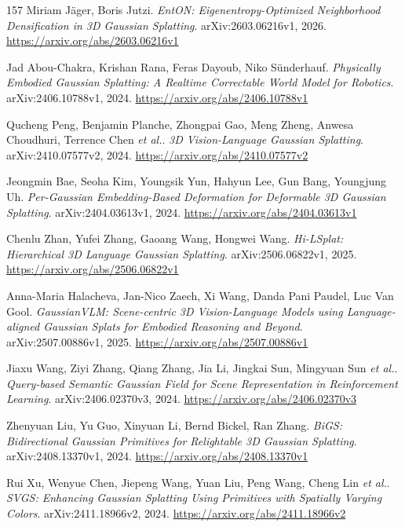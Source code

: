 \documentclass[11pt,a4paper]{article}
\begin{document}
\begin{thebibliography}{157}
Miriam J\"{a}ger, Boris Jutzi.
\newblock \emph{EntON: Eigenentropy-Optimized Neighborhood Densification in 3D Gaussian Splatting}.
\newblock arXiv:2603.06216v1, 2026.
\newblock \url{https://arxiv.org/abs/2603.06216v1}

Jad Abou-Chakra, Krishan Rana, Feras Dayoub, Niko S\"{u}nderhauf.
\newblock \emph{Physically Embodied Gaussian Splatting: A Realtime Correctable World Model for Robotics}.
\newblock arXiv:2406.10788v1, 2024.
\newblock \url{https://arxiv.org/abs/2406.10788v1}

Qucheng Peng, Benjamin Planche, Zhongpai Gao, Meng Zheng, Anwesa Choudhuri, Terrence Chen \emph{et al.}.
\newblock \emph{3D Vision-Language Gaussian Splatting}.
\newblock arXiv:2410.07577v2, 2024.
\newblock \url{https://arxiv.org/abs/2410.07577v2}

Jeongmin Bae, Seoha Kim, Youngsik Yun, Hahyun Lee, Gun Bang, Youngjung Uh.
\newblock \emph{Per-Gaussian Embedding-Based Deformation for Deformable 3D Gaussian Splatting}.
\newblock arXiv:2404.03613v1, 2024.
\newblock \url{https://arxiv.org/abs/2404.03613v1}

Chenlu Zhan, Yufei Zhang, Gaoang Wang, Hongwei Wang.
\newblock \emph{Hi-LSplat: Hierarchical 3D Language Gaussian Splatting}.
\newblock arXiv:2506.06822v1, 2025.
\newblock \url{https://arxiv.org/abs/2506.06822v1}

Anna-Maria Halacheva, Jan-Nico Zaech, Xi Wang, Danda Pani Paudel, Luc Van Gool.
\newblock \emph{GaussianVLM: Scene-centric 3D Vision-Language Models using Language-aligned Gaussian Splats for Embodied Reasoning and Beyond}.
\newblock arXiv:2507.00886v1, 2025.
\newblock \url{https://arxiv.org/abs/2507.00886v1}

Jiaxu Wang, Ziyi Zhang, Qiang Zhang, Jia Li, Jingkai Sun, Mingyuan Sun \emph{et al.}.
\newblock \emph{Query-based Semantic Gaussian Field for Scene Representation in Reinforcement Learning}.
\newblock arXiv:2406.02370v3, 2024.
\newblock \url{https://arxiv.org/abs/2406.02370v3}

Zhenyuan Liu, Yu Guo, Xinyuan Li, Bernd Bickel, Ran Zhang.
\newblock \emph{BiGS: Bidirectional Gaussian Primitives for Relightable 3D Gaussian Splatting}.
\newblock arXiv:2408.13370v1, 2024.
\newblock \url{https://arxiv.org/abs/2408.13370v1}

Rui Xu, Wenyue Chen, Jiepeng Wang, Yuan Liu, Peng Wang, Cheng Lin \emph{et al.}.
\newblock \emph{SVGS: Enhancing Gaussian Splatting Using Primitives with Spatially Varying Colors}.
\newblock arXiv:2411.18966v2, 2024.
\newblock \url{https://arxiv.org/abs/2411.18966v2}


\end{thebibliography}
\end{document}
